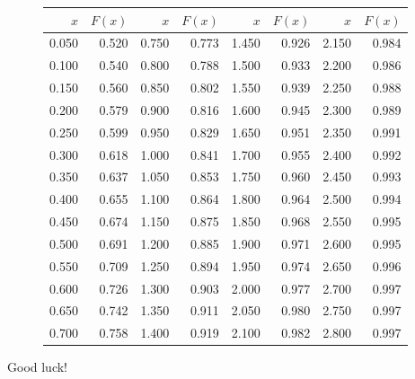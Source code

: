 \documentclass[addpoints, answers]{exam} %
\begin{document}
\begin{figure}[b]
\begin{minipage}[b]{0.35\linewidth}
\begin{tikzpicture}
\end{tikzpicture}
\par\vspace{0pt}
  \end{minipage}%
  \begin{minipage}[b]{0.60\linewidth}
    \centering
\begin{tabular}{rr|rr|rr|rr}
  \hline
$x$ & $F(x)$ & $x$ & $F(x)$ & $x$ & $F(x)$ & $x$ & $F(x)$ \\
  \hline
0.050 & 0.520 & 0.750 & 0.773 & 1.450 & 0.926 & 2.150 & 0.984 \\
  0.100 & 0.540 & 0.800 & 0.788 & 1.500 & 0.933 & 2.200 & 0.986 \\
  0.150 & 0.560 & 0.850 & 0.802 & 1.550 & 0.939 & 2.250 & 0.988 \\
  0.200 & 0.579 & 0.900 & 0.816 & 1.600 & 0.945 & 2.300 & 0.989 \\
  0.250 & 0.599 & 0.950 & 0.829 & 1.650 & 0.951 & 2.350 & 0.991 \\
  0.300 & 0.618 & 1.000 & 0.841 & 1.700 & 0.955 & 2.400 & 0.992 \\
  0.350 & 0.637 & 1.050 & 0.853 & 1.750 & 0.960 & 2.450 & 0.993 \\
  0.400 & 0.655 & 1.100 & 0.864 & 1.800 & 0.964 & 2.500 & 0.994 \\
  0.450 & 0.674 & 1.150 & 0.875 & 1.850 & 0.968 & 2.550 & 0.995 \\
  0.500 & 0.691 & 1.200 & 0.885 & 1.900 & 0.971 & 2.600 & 0.995 \\
  0.550 & 0.709 & 1.250 & 0.894 & 1.950 & 0.974 & 2.650 & 0.996 \\
  0.600 & 0.726 & 1.300 & 0.903 & 2.000 & 0.977 & 2.700 & 0.997 \\
  0.650 & 0.742 & 1.350 & 0.911 & 2.050 & 0.980 & 2.750 & 0.997 \\
  0.700 & 0.758 & 1.400 & 0.919 & 2.100 & 0.982 & 2.800 & 0.997 \\
   \hline
\end{tabular}
\par\vspace{0pt}
\end{minipage}
\label{fig:test}
\end{figure}

\begin{flushright}
Good luck!
\end{flushright}
\end{document}
